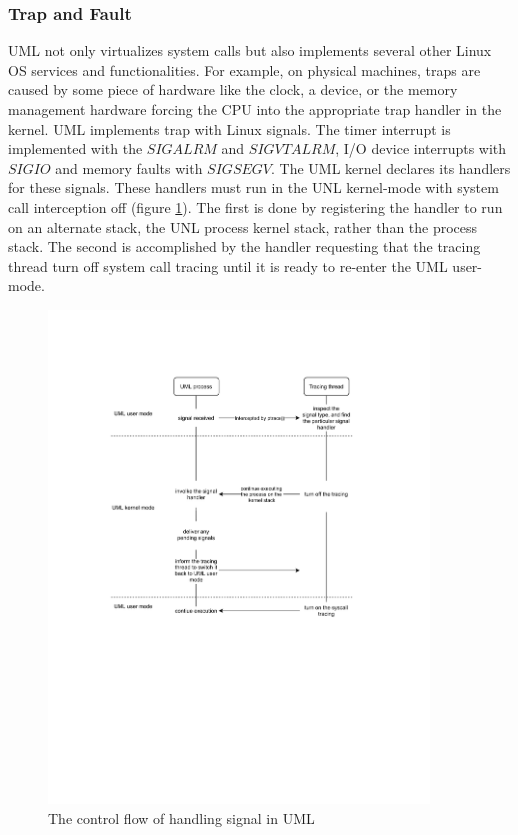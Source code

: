 \subsubsection{Trap and Fault}


UML not only virtualizes system calls but also implements several other Linux OS services and functionalities. For example, on physical machines, traps are caused by some piece of hardware like the clock, a device, or the memory management hardware forcing the CPU into the appropriate trap handler in the kernel. UML implements trap with Linux signals. The timer interrupt is implemented with the $SIGALRM$ and $SIGVTALRM$, I/O device interrupts with $SIGIO$ and memory faults with $SIGSEGV$. The UML kernel declares its handlers for these signals. These handlers must run in the UNL kernel-mode with system call interception off (figure \ref{fig:uml-sig}). The first is done by registering the handler to run on an alternate stack, the UNL process kernel stack, rather than the process stack. The second is accomplished by the handler requesting that the tracing thread turn off system call tracing until it is ready to re-enter the UML user-mode.

\begin{figure}[h]
    \centering
    \includegraphics[clip, trim=0.5cm 16cm 3cm 0.5cm, width=0.9\textwidth, height=0.8\textwidth]{ch2/UML-sig.pdf}
    \caption{The control flow of handling signal in UML}
    \label{fig:uml-sig}
\end{figure}

